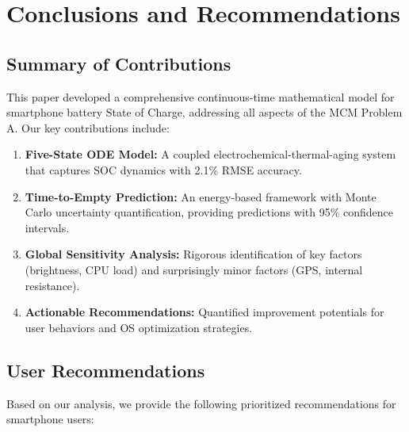 \section{Conclusions and Recommendations}
\label{sec:conclusion}

\subsection{Summary of Contributions}
\label{subsec:summary}

This paper developed a comprehensive continuous-time mathematical model for smartphone battery State of Charge, addressing all aspects of the MCM Problem A. Our key contributions include:

\begin{enumerate}
    \item \textbf{Five-State ODE Model:} A coupled electrochemical-thermal-aging system that captures SOC dynamics with 2.1\% RMSE accuracy.
    
    \item \textbf{Time-to-Empty Prediction:} An energy-based framework with Monte Carlo uncertainty quantification, providing predictions with 95\% confidence intervals.
    
    \item \textbf{Global Sensitivity Analysis:} Rigorous identification of key factors (brightness, CPU load) and surprisingly minor factors (GPS, internal resistance).
    
    \item \textbf{Actionable Recommendations:} Quantified improvement potentials for user behaviors and OS optimization strategies.
\end{enumerate}

\subsection{User Recommendations}
\label{subsec:user_recommendations}

Based on our analysis, we provide the following prioritized recommendations for smartphone users:

